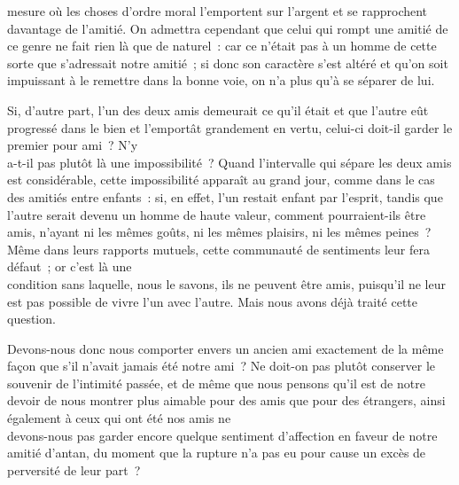 \documentclass[french,twoside]{book} %
\begin{document}
mesure où les choses d’ordre moral l’emportent sur l’argent et se rapprochent davantage de l’amitié. On admettra cependant que celui qui rompt une amitié de ce genre ne fait rien là que de naturel : car ce n’était pas à un homme de cette sorte que s’adressait notre amitié ; si donc son caractère s’est altéré et qu’on soit impuissant à le remettre dans la bonne voie, on n’a plus qu’à se séparer de lui.\par
Si, d’autre part, l’un des deux amis demeurait ce qu’il était et que l’autre eût progressé dans le bien et l’emportât grandement en vertu, celui-ci doit-il garder le premier pour ami ? N’y \\
a-t-il pas plutôt là une impossibilité ? Quand l’intervalle qui sépare les deux amis est considérable, cette impossibilité apparaît au grand jour, comme dans le cas des amitiés entre enfants : si, en effet, l’un restait enfant par l’esprit, tandis que l’autre serait devenu un homme de haute valeur, comment pourraient-ils être amis, n’ayant ni les mêmes goûts, ni les mêmes plaisirs, ni les mêmes peines ? Même dans leurs rapports mutuels, cette communauté de sentiments leur fera défaut ; or c’est là une \\
condition sans laquelle, nous le savons, ils ne peuvent être amis, puisqu’il ne leur est pas possible de vivre l’un avec l’autre. Mais nous avons déjà traité cette question.\par
Devons-nous donc nous comporter envers un ancien ami exactement de la même façon que s’il n’avait jamais été notre ami ? Ne doit-on pas plutôt conserver le souvenir de l’intimité passée, et de même que nous pensons qu’il est de notre devoir de nous montrer plus aimable pour des amis que pour des étrangers, ainsi également à ceux qui ont été nos amis ne \\
devons-nous pas garder encore quelque sentiment d’affection en faveur de notre amitié d’antan, du moment que la rupture n’a pas eu pour cause un excès de perversité de leur part ?
\end{document}
